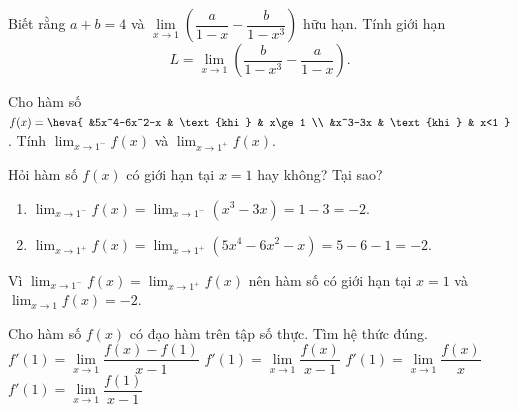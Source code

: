 \begin{ex}%
	Biết rằng $a+b=4$ và $\lim\limits_{x\to 1}\left(\dfrac{a}{1-x}-\dfrac{b}{1-x^3}\right)$ hữu  hạn. Tính giới hạn \[L=\lim\limits_{x\to 1}\left(\dfrac{b}{1-x^3}-\dfrac{a}{1-x}\right).\]
\end{ex}

\begin{bt}%
	Cho hàm số $f(x)=\heva{
		&5x^4-6x^2-x & \text{khi } & x\ge1 \\ 
		&x^3-3x & \text{khi } & x<1
	}$. Tính $\displaystyle\lim_{x\to 1^-}f(x)$ và $\displaystyle\lim_{x\to 1^+}f(x)$.
	
	Hỏi hàm số $f(x)$ có giới hạn tại $x=1$ hay không? Tại sao?
	
	\loigiai
	{
		\begin{enumerate}
			\item $\displaystyle\lim_{x\to 1^-}f(x)=\lim_{x\to 1^-}(x^3-3x)=1-3=-2$.
			\item $\displaystyle\lim_{x\to 1^+}f(x)=\lim_{x\to 1^+}(5x^4-6x^2-x)=5-6-1=-2$.
		\end{enumerate}
		Vì $\displaystyle\lim_{x\to 1^-}f(x) = \lim_{x\to 1^+}f(x)$ nên hàm số có giới hạn tại $x=1$ và $\displaystyle\lim_{x\to 1}f(x)=-2$.
	}
	
\end{bt}

\begin{ex}%
	Cho hàm số $ f\left( x  \right) $ có đạo hàm trên tập số thực. Tìm hệ thức đúng.
	 \choice
		{\True $ f'\left( {1} \right) = \mathop {\lim }\limits_{x \to 1}  \dfrac{{f\left( x \right) - f\left( 1 \right)}}{{x - 1}}$}
		 {$ f'\left( {1} \right) = \mathop {\lim }\limits_{x \to 1} \dfrac{{f\left( x \right) }}{{x - 1}}$}
		{$ f'\left( {1} \right) = \mathop {\lim }\limits_{x \to 1} \dfrac{{f\left(  x \right)}}{{x}}$}
		{$ f'\left( {1} \right) = \mathop {\lim }\limits_{x  \to 1} \dfrac{{f\left( 1 \right)}}{{x - 1}}$}
\end{ex}

